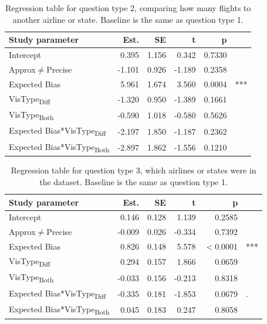 \documentclass[10pt,journal,compsoc]{IEEEtran}
\begin{document}
\begin{table}[!t]
\renewcommand{\arraystretch}{1.3}
\caption{Regression table for question type 2, comparing how many flights to another airline or state. Baseline is the same as question type 1.}
\label{table_q2}
\centering
\begin{tabular}{|l||r|r|r|r@{}l|}
\hline
Study parameter & Est. & SE & t & p & \\
\hline
\hline
Intercept & 0.395 & 1.156 & 0.342 & 0.7330 &  \\
\hline
Approx$\neq$Precise & -1.101 & 0.926 & -1.189 & 0.2358 & \\
\hline
Expected Bias & 5.961 & 1.674 & 3.560 & 0.0004 & *** \\
\hline
VisType\textsubscript{Diff} & -1.320 & 0.950 & -1.389 & 0.1661 &  \\
\hline
VisType\textsubscript{Both} & -0.590 & 1.018 & -0.580 & 0.5626 &  \\
\hline
Expected Bias*VisType\textsubscript{Diff} & -2.197 & 1.850 & -1.187 & 0.2362 &  \\
\hline
Expected Bias*VisType\textsubscript{Both} & -2.897 & 1.862 & -1.556 & 0.1210 &  \\
\hline
\end{tabular}
\end{table}

\begin{table}[!t]
\renewcommand{\arraystretch}{1.3}
\caption{Regression table for question type 3, which airlines or states were in the dataset. Baseline is the same as question type 1.}
\label{table_q3}
\centering
\begin{tabular}{|l||r|r|r|r@{}l|}
\hline
Study parameter & Est. & SE & t & p & \\
\hline
\hline
Intercept & 0.146 & 0.128 & 1.139 & 0.2585 &  \\
\hline
Approx$\neq$Precise & -0.009 & 0.026 & -0.334 & 0.7392 & \\
\hline
Expected Bias & 0.826 & 0.148 & 5.578 & $<$0.0001 & *** \\
\hline
VisType\textsubscript{Diff} & 0.294 & 0.157 & 1.866 & 0.0659 &  \\
\hline
VisType\textsubscript{Both} & -0.033 & 0.156 & -0.213 & 0.8318 &  \\
\hline
Expected Bias*VisType\textsubscript{Diff} & -0.335 & 0.181 & -1.853 & 0.0679 & . \\
\hline
Expected Bias*VisType\textsubscript{Both} & 0.045 & 0.183 & 0.247 & 0.8058 &  \\
\hline
\end{tabular}
\end{table}
\end{document}
